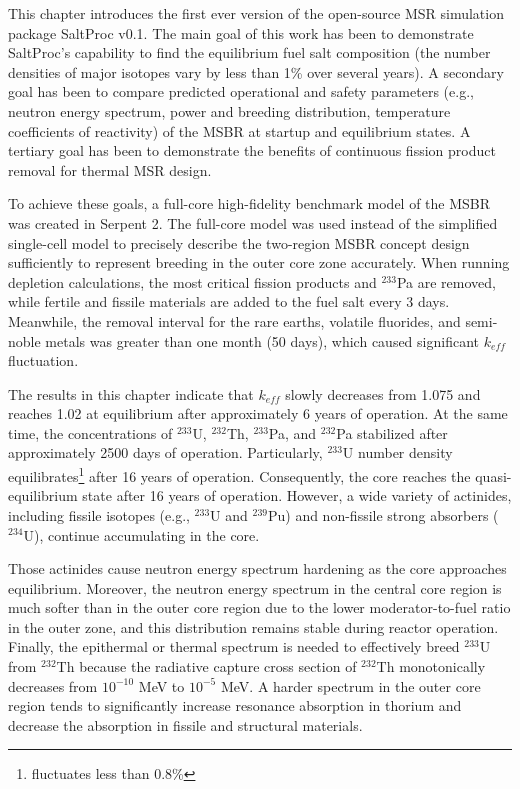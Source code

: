 This chapter introduces the first ever version of the open-source \gls{MSR} 
simulation package SaltProc v0.1. The main goal of this work has been to 
demonstrate SaltProc's capability to find the equilibrium fuel salt 
composition (the number densities of major isotopes vary by less than 1\% over 
several years). A secondary goal has been to compare predicted operational and 
safety parameters (e.g., neutron energy spectrum, power and breeding 
distribution, temperature coefficients of reactivity) of the \gls{MSBR} at 
startup and equilibrium states. A tertiary goal has been to demonstrate the 
benefits of continuous fission product removal for thermal \gls{MSR} design.

To achieve these goals, a full-core high-fidelity benchmark model of the 
\gls{MSBR} was created in Serpent 2. The full-core model was used instead of 
the simplified single-cell model \cite{betzler_molten_2017, 	
rykhlevskii_online_2017, betzler_fuel_2018} to precisely describe the 
two-region \gls{MSBR} concept design sufficiently to represent breeding in the 
outer core zone accurately. When running depletion calculations, the most 
critical fission products and $^{233}$Pa are removed, while fertile and  
fissile materials are added to the fuel salt every 3 days.  Meanwhile, the 
removal interval for the rare earths, volatile fluorides, and semi-noble 
metals was greater than one month (50 days), which caused significant 
$k_{eff}$  
fluctuation. 

The results in this chapter indicate that $k_{eff}$ slowly decreases from 
1.075 and reaches 1.02 at equilibrium after approximately 6 years of 
operation. At the same time, the concentrations of $^{233}$U, $^{232}$Th, 
$^{233}$Pa, and $^{232}$Pa stabilized after approximately 2500 days of 
operation. Particularly, $^{233}$U number density 
equilibrates\footnote{fluctuates less than 0.8\%} after 16 years of operation. 
Consequently, the core reaches the quasi-equilibrium state after 16 years of 
operation. However, a wide variety of actinides, including fissile isotopes 
(e.g., $^{233}$U and $^{239}$Pu) and non-fissile strong absorbers ($^{234}$U), 
continue accumulating in the core. 

Those actinides cause neutron energy spectrum hardening as the core  
approaches equilibrium. Moreover, the neutron energy spectrum in the central 
core region is much softer than in the outer core region due to the lower 
moderator-to-fuel ratio in the outer zone, and this distribution remains 
stable during reactor operation. Finally, the epithermal or thermal spectrum 
is needed to effectively breed $^{233}$U from $^{232}$Th because the radiative 
capture cross section of $^{232}$Th monotonically decreases from $10^{-10}$ 
MeV to $10^{-5}$ MeV. A harder spectrum in the outer core region tends to 
significantly increase resonance absorption in thorium and decrease the 
absorption in fissile and structural materials. 

